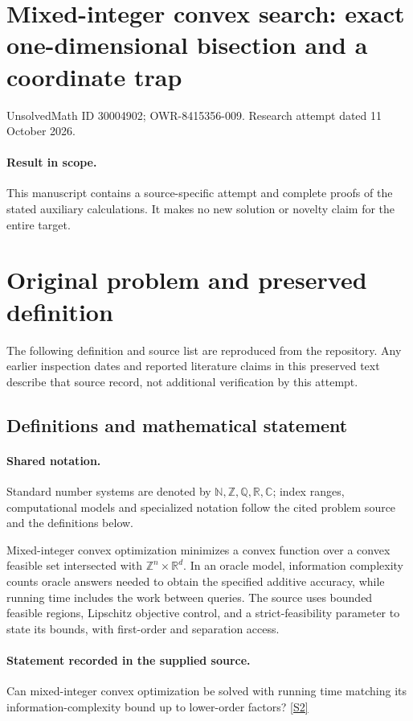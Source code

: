 \documentclass[11pt]{article}
\begin{document}
\section*{Mixed-integer convex search: exact one-dimensional bisection and a coordinate trap}
\noindent UnsolvedMath ID 30004902; OWR-8415356-009. Research attempt dated 11 October 2026.
\paragraph{Result in scope.}This manuscript contains a source-specific attempt and complete proofs of the stated auxiliary calculations. It makes no new solution or novelty claim for the entire target.
\section{Original problem and preserved definition}
The following definition and source list are reproduced from the repository. Any earlier inspection dates and reported literature claims in this preserved text describe that source record, not additional verification by this attempt.
\subsection{Definitions and mathematical statement}

\paragraph{Shared notation.}Standard number systems are denoted by $\mathbb N,\mathbb Z,\mathbb Q,\mathbb R,\mathbb C$; index ranges, computational models and specialized notation follow the cited problem source and the definitions below.


Mixed-integer convex optimization minimizes a convex function over a convex feasible set intersected with $\mathbb Z^n\times\mathbb R^d$. In an oracle model, information complexity counts oracle answers needed to obtain the specified additive accuracy, while running time includes the work between queries. The source uses bounded feasible regions, Lipschitz objective control, and a strict-feasibility parameter to state its bounds, with first-order and separation access.
\paragraph{Statement recorded in the supplied source.}
Can mixed-integer convex optimization be solved with running time matching its information-complexity bound up to lower-order factors? \href{https://doi.org/10.4171/owr/2021/53}{[S2]}
\end{document}
